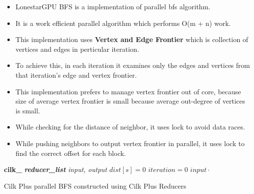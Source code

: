 \documentclass{article}
\begin{document}
\begin{itemize}
\item LonestarGPU BFS is a implementation of parallel bfs algorithm.
\item It is a work efficient parallel algorithm which performs O(m + n) work. 
\item This implementation uses \textbf{Vertex and Edge Frontier} which is collection of vertices and edges in perticular iteration.
\item To achieve this, in each iteration it examines only the edges and vertices from that iteration's edge and vertex frontier.
\item This implementation prefers to manage vertex frontier out of core, because size of average vertex frontier is small because average out-degree of vertices is small. 
\item While checking for the distance of neighbor, it uses lock to avoid data races.
\item While pushing neighbors to output vertex frontier in parallel, it uses lock to find the correct offset for each block.    
\end{itemize}


 
\IncMargin{1em}
\begin{algorithm}
	\BlankLine 
    \textbf{cilk\_}
	\BlankLine
	\emph{\textbf{reducer\_list} input, output}\;
	\emph{$dist[s] = 0$  }\;
    \emph{$iteration = 0$  }\;
    	\emph{$input\cdot$}\;
	
	\BlankLine
\caption{Cilk Plus parallel BFS constructed using Cilk Plus Reducers }\label{algo:Par_BFS}
\end{algorithm}\DecMargin{1em}


\end{document}
